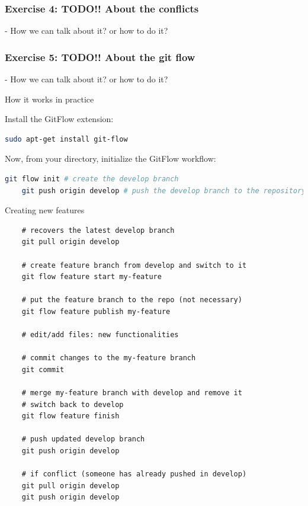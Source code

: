 \documentclass[svgnames]{beamer}
\begin{document}
\begin{frame}[fragile]
\frametitle{Exercise 4: TODO!! About the conflicts }

- How we can talk about it? or how to do it? 

\end{frame}

\begin{frame}[fragile]
\frametitle{Exercise 5: TODO!! About the git flow}

- How we can talk about it? or how to do it? 

\end{frame}
\begin{frame}[fragile]{How it works in practice}

    Install the GitFlow extension:

    \begin{lstlisting}[language=bash]
    sudo apt-get install git-flow
    \end{lstlisting}

    \vspace{1em}
    Now, from your directory, initialize the GitFlow workflow:

    \begin{lstlisting}[language=bash]
    git flow init # create the develop branch
    git push origin develop # push the develop branch to the repository
    \end{lstlisting}

\end{frame}

\begin{frame}[fragile]{Creating new features}

    \begin{lstlisting}
    # recovers the latest develop branch
    git pull origin develop

    # create feature branch from develop and switch to it
    git flow feature start my-feature 

    # put the feature branch to the repo (not necessary)
    git flow feature publish my-feature 

    # edit/add files: new functionalities

    # commit changes to the my-feature branch
    git commit 

    # merge my-feature branch with develop and remove it
    # switch back to develop
    git flow feature finish

    # push updated develop branch
    git push origin develop

    # if conflict (someone has already pushed in develop)
    git pull origin develop
    git push origin develop
    \end{lstlisting}

\end{frame}
\end{document}
